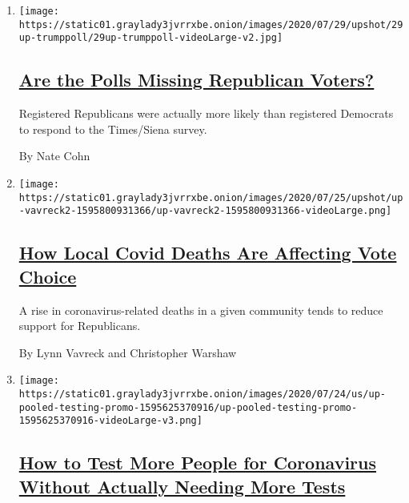 \begin{enumerate}
\def\labelenumi{\arabic{enumi}.}
\item
  \texttt{[image: https://static01.graylady3jvrrxbe.onion/images/2020/07/29/upshot/29up-trumppoll/29up-trumppoll-videoLarge-v2.jpg]}

  \hypertarget{are-the-polls-missing-republican-voters}{%
  \subsection{\texorpdfstring{\href{/2020/07/29/upshot/polls-political-party-republicans.html}{Are
  the Polls Missing Republican
  Voters?}}{Are the Polls Missing Republican Voters?}}\label{are-the-polls-missing-republican-voters}}

  Registered Republicans were actually more likely than registered
  Democrats to respond to the Times/Siena survey.

  By Nate Cohn
\item
  \texttt{[image: https://static01.graylady3jvrrxbe.onion/images/2020/07/25/upshot/up-vavreck2-1595800931366/up-vavreck2-1595800931366-videoLarge.png]}

  \hypertarget{how-local-covid-deaths-are-affecting-vote-choice}{%
  \subsection{\texorpdfstring{\href{/2020/07/28/upshot/polling-trump-virus-election.html}{How
  Local Covid Deaths Are Affecting Vote
  Choice}}{How Local Covid Deaths Are Affecting Vote Choice}}\label{how-local-covid-deaths-are-affecting-vote-choice}}

  A rise in coronavirus-related deaths in a given community tends to
  reduce support for Republicans.

  By Lynn Vavreck and Christopher Warshaw
\item
  \texttt{[image: https://static01.graylady3jvrrxbe.onion/images/2020/07/24/us/up-pooled-testing-promo-1595625370916/up-pooled-testing-promo-1595625370916-videoLarge-v3.png]}

  \hypertarget{how-to-test-more-people-for-coronavirus-without-actually-needing-more-tests}{%
  \subsection{\texorpdfstring{\href{/interactive/2020/07/27/upshot/coronavirus-pooled-testing.html}{How
  to Test More People for Coronavirus Without Actually Needing More
  Tests}}{How to Test More People for Coronavirus Without Actually Needing More Tests}}\label{how-to-test-more-people-for-coronavirus-without-actually-needing-more-tests}}


\end{enumerate}
